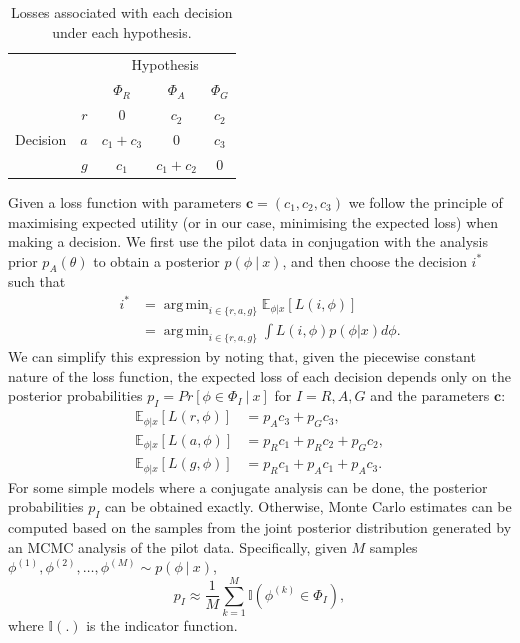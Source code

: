 \documentclass[AMA,STIX1COL]{WileyNJD-v2}
\DeclareMathOperator*{\argmin}{arg\,min}
\begin{document}
\begin{table}
\caption{Losses associated with each decision under each hypothesis.}
\centering
\begin{tabular}{r r c c c}
\toprule
& & \multicolumn{3}{c}{Hypothesis} \\
& & $\Phi_{R}$ & $\Phi_{A}$ & $\Phi_{G}$ \\
\midrule
\multirow{3}{*}{Decision} & $r$ & 0 & $c_{2}$ & $c_{2}$ \\
 & $a$ & $c_{1} + c_{3}$ & 0 & $c_{3}$ \\
 & $g$ & $c_{1}$ & $c_{1} + c_{2}$ & 0  \\
\bottomrule
\end{tabular}
\label{tab:loss}
\end{table}


Given a loss function with parameters $\mathbf{c} = (c_1, c_2, c_3)$ we follow the principle of maximising expected utility (or in our case, minimising the expected loss) when making a decision. We first use the pilot data in conjugation with the analysis prior $p_{A}(\theta)$ to obtain a posterior $p(\phi ~|~ x)$, and then choose the decision $i^{*}$ such that 
\begin{align}
i^{*} & = \argmin_{i \in \{r,a,g\}} \mathbb{E}_{\phi | x} [ L(i, \phi) ] \\
 & = \argmin_{i \in \{r,a,g\}} \int L(i, \phi) p(\phi | x) d\phi.
\end{align}
We can simplify this expression by noting that, given the piecewise constant nature of the loss function, the expected loss of each decision depends only on the posterior probabilities $p_{I} =  Pr[\phi \in \Phi_{I} ~|~ x]$ for $I = R, A, G$ and the parameters $\mathbf{c}$:
\begin{align}\label{eqn:exp_loss}
\mathbb{E}_{\phi | x} [ L(r, \phi) ] & = p_{A}c_{3} + p_{G}c_{3}, \\
\mathbb{E}_{\phi | x} [ L(a, \phi) ] & = p_{R}c_{1} + p_{R}c_{2} + p_{G}c_{2}, \\
\mathbb{E}_{\phi | x} [ L(g, \phi) ] & = p_{R}c_{1} + p_{A}c_{1} + p_{A}c_{3}.
\end{align}
For some simple models where a conjugate analysis can be done, the posterior probabilities $p_I$ can be obtained exactly. Otherwise, Monte Carlo estimates can be computed based on the samples from the joint posterior distribution generated by an MCMC analysis of the pilot data. Specifically, given $M$ samples $\phi^{(1)}, \phi^{(2)}, \ldots , \phi^{(M)} \sim p(\phi ~|~ x)$, 
\begin{equation}
p_I \approx \frac{1}{M} \sum_{k = 1}^{M}  \mathbb{I}(\phi^{(k)} \in \Phi_I),
\end{equation}
where $\mathbb{I}(.)$ is the indicator function.
\end{document}
